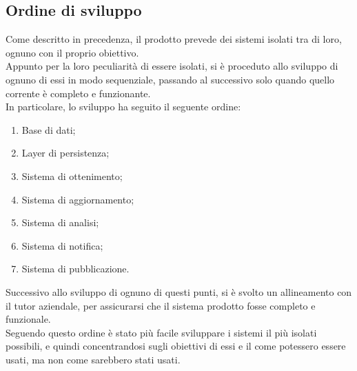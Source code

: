 	\subsection{Ordine di sviluppo}
		Come descritto in precedenza, il prodotto prevede dei sistemi isolati tra di loro, ognuno con il proprio obiettivo. \\
		Appunto per la loro peculiarità di essere isolati, si è proceduto allo sviluppo di ognuno di essi in modo sequenziale, passando al successivo solo quando quello corrente è completo e funzionante. \\
		In particolare, lo sviluppo ha seguito il seguente ordine:
		\begin{enumerate}
			\item Base di dati;
			\item Layer di persistenza;
			\item Sistema di ottenimento;
			\item Sistema di aggiornamento;
			\item Sistema di analisi;
			\item Sistema di notifica;
			\item Sistema di pubblicazione.
		\end{enumerate}
		Successivo allo sviluppo di ognuno di questi punti, si è svolto un allineamento con il tutor aziendale, per assicurarsi che il sistema prodotto fosse completo e funzionale.\\
		Seguendo questo ordine è stato più facile sviluppare i sistemi il più isolati possibili, e quindi concentrandosi sugli obiettivi di essi e il come potessero essere usati, ma non come sarebbero stati usati. \\
